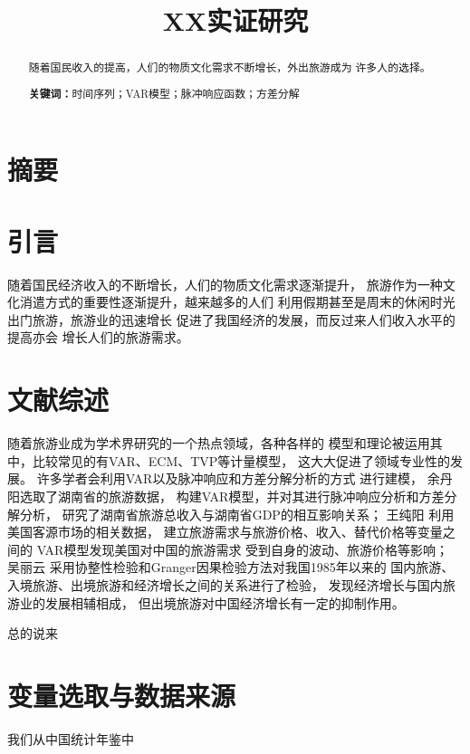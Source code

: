 \documentclass[nobib]{tufte-handout}
\title{XX实证研究}
\def\keywords#1{\noindent\textbf{关键词：}#1}
\begin{document}
    \maketitle    

    \section{摘要}
    \begin{abstract}
        随着国民收入的提高，人们的物质文化需求不断增长，外出旅游成为
        许多人的选择。

        \keywords{时间序列；VAR模型；脉冲响应函数；方差分解}
    \end{abstract}

    \section{引言}
    随着国民经济收入的不断增长，人们的物质文化需求逐渐提升，
    旅游作为一种文化消遣方式的重要性逐渐提升，越来越多的人们
    利用假期甚至是周末的休闲时光出门旅游，旅游业的迅速增长
    促进了我国经济的发展，而反过来人们收入水平的提高亦会
    增长人们的旅游需求。

    \section{文献综述}
    随着旅游业成为学术界研究的一个热点领域，各种各样的
    模型和理论被运用其中，比较常见的有VAR、ECM、TVP等计量模型，
    这大大促进了领域专业性的发展\cite{song2006forecasting}。
    许多学者会利用VAR以及脉冲响应和方差分解分析的方式
    进行建模，
    余丹阳\cite{余丹阳2018基于}选取了湖南省的旅游数据，
    构建VAR模型，并对其进行脉冲响应分析和方差分解分析，
    研究了湖南省旅游总收入与湖南省GDP的相互影响关系；
    王纯阳\cite{王纯阳2010基于}
    利用美国客源市场的相关数据，
    建立旅游需求与旅游价格、收入、替代价格等变量之间的
    VAR模型发现美国对中国的旅游需求
    受到自身的波动、旅游价格等影响；
    吴丽云\cite{吴丽云2010我国旅游业与经济增长的关系分析}
    采用协整性检验和Granger因果检验方法对我国1985年以来的
    国内旅游、入境旅游、出境旅游和经济增长之间的关系进行了检验，
    发现经济增长与国内旅游业的发展相辅相成，
    但出境旅游对中国经济增长有一定的抑制作用。

    总的说来

    \section{变量选取与数据来源}
    我们从中国统计年鉴\cite{中华2014中}中
\end{document}
